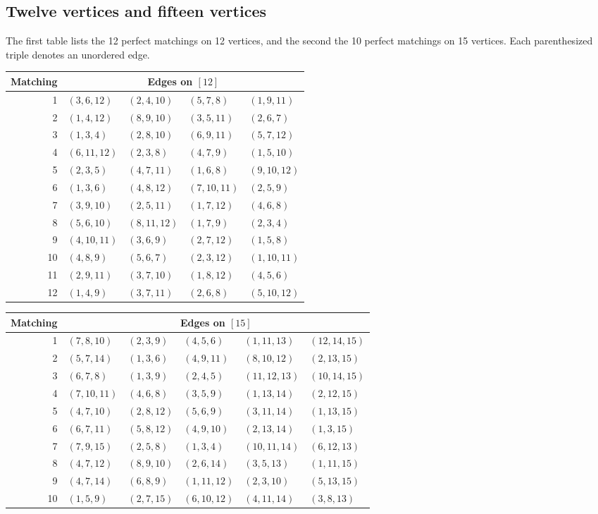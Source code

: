 \documentclass[10pt]{article}
\numberwithin{equation}{section}
\begin{document}
\subsection{Twelve vertices and fifteen vertices}\label{finite:subsec:twelve-fifteen}
The first table lists the 12 perfect matchings on 12 vertices, and the second the 10 perfect matchings on 15 vertices. Each parenthesized triple denotes an unordered edge.
\begin{center}\small
\begin{tabular}{rllll}
\toprule
Matching&\multicolumn{4}{c}{Edges on $[12]$}\\\midrule
1&$(3,6,12)$&$(2,4,10)$&$(5,7,8)$&$(1,9,11)$\\
2&$(1,4,12)$&$(8,9,10)$&$(3,5,11)$&$(2,6,7)$\\
3&$(1,3,4)$&$(2,8,10)$&$(6,9,11)$&$(5,7,12)$\\
4&$(6,11,12)$&$(2,3,8)$&$(4,7,9)$&$(1,5,10)$\\
5&$(2,3,5)$&$(4,7,11)$&$(1,6,8)$&$(9,10,12)$\\
6&$(1,3,6)$&$(4,8,12)$&$(7,10,11)$&$(2,5,9)$\\
7&$(3,9,10)$&$(2,5,11)$&$(1,7,12)$&$(4,6,8)$\\
8&$(5,6,10)$&$(8,11,12)$&$(1,7,9)$&$(2,3,4)$\\
9&$(4,10,11)$&$(3,6,9)$&$(2,7,12)$&$(1,5,8)$\\
10&$(4,8,9)$&$(5,6,7)$&$(2,3,12)$&$(1,10,11)$\\
11&$(2,9,11)$&$(3,7,10)$&$(1,8,12)$&$(4,5,6)$\\
12&$(1,4,9)$&$(3,7,11)$&$(2,6,8)$&$(5,10,12)$\\
\bottomrule
\end{tabular}
\end{center}
\begin{center}\small
\begin{tabular}{rlllll}
\toprule
Matching&\multicolumn{5}{c}{Edges on $[15]$}\\\midrule
1&$(7,8,10)$&$(2,3,9)$&$(4,5,6)$&$(1,11,13)$&$(12,14,15)$\\
2&$(5,7,14)$&$(1,3,6)$&$(4,9,11)$&$(8,10,12)$&$(2,13,15)$\\
3&$(6,7,8)$&$(1,3,9)$&$(2,4,5)$&$(11,12,13)$&$(10,14,15)$\\
4&$(7,10,11)$&$(4,6,8)$&$(3,5,9)$&$(1,13,14)$&$(2,12,15)$\\
5&$(4,7,10)$&$(2,8,12)$&$(5,6,9)$&$(3,11,14)$&$(1,13,15)$\\
6&$(6,7,11)$&$(5,8,12)$&$(4,9,10)$&$(2,13,14)$&$(1,3,15)$\\
7&$(7,9,15)$&$(2,5,8)$&$(1,3,4)$&$(10,11,14)$&$(6,12,13)$\\
8&$(4,7,12)$&$(8,9,10)$&$(2,6,14)$&$(3,5,13)$&$(1,11,15)$\\
9&$(4,7,14)$&$(6,8,9)$&$(1,11,12)$&$(2,3,10)$&$(5,13,15)$\\
10&$(1,5,9)$&$(2,7,15)$&$(6,10,12)$&$(4,11,14)$&$(3,8,13)$\\
\bottomrule
\end{tabular}
\end{center}
\end{document}
